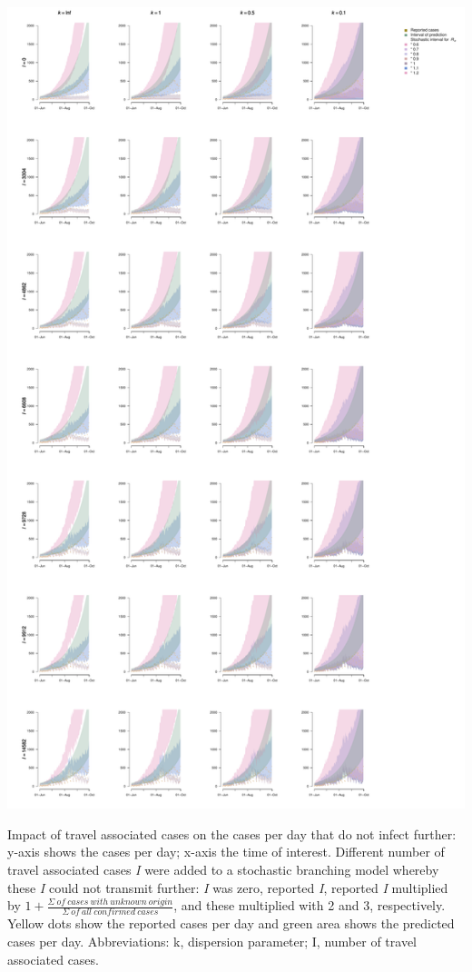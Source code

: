 \documentclass[10pt, a4paper, twoside]{article}
\begin{document}
\begin{suppfigure}[h]
\centering
\includegraphics[scale=0.3]{sim_cases_d_imports_2021-02-24.pdf}
\caption{Impact of travel associated cases on the cases per day that do not infect further: y-axis shows the cases per day; x-axis the time of interest. Different number of travel associated cases \emph{I} were added to a stochastic branching model whereby these \emph{I} could not transmit further: \emph{I} was zero, reported \emph{I}, reported \emph{I} multiplied by $1+ \frac{\Sigma ~of ~cases ~with ~unknown ~origin }{\Sigma ~of ~all ~confirmed ~cases}$, and these multiplied with 2 and 3, respectively. Yellow dots show the reported cases per day and green area shows the predicted cases per day. Abbreviations: k, dispersion parameter; I, number of travel associated cases.}
\end{suppfigure}
\end{document}
